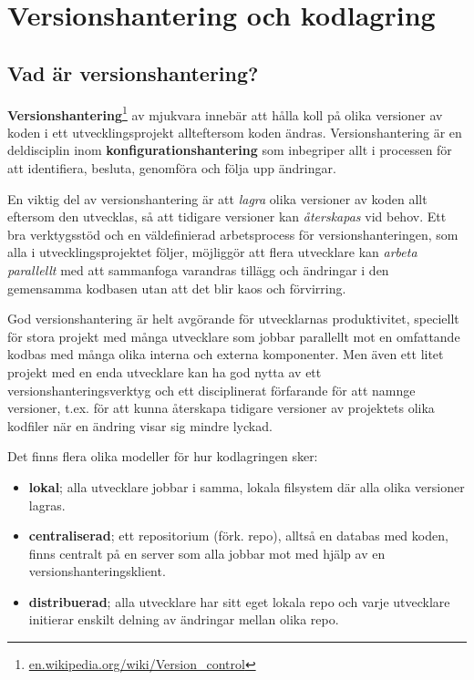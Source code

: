 

\chapter{Versionshantering och kodlagring}

\section{Vad är versionshantering?}

\textbf{Versionshantering}\footnote{\href{https://en.wikipedia.org/wiki/Version_control}{en.wikipedia.org/wiki/Version\_control}}  av mjukvara innebär att hålla koll på olika versioner av koden i ett utvecklingsprojekt allteftersom koden ändras. Versionshantering är en deldisciplin inom \textbf{konfigurationshantering}  som inbegriper allt i processen för att identifiera, besluta, genomföra och följa upp ändringar.

En viktig del av versionshantering är att \textit{lagra} olika versioner av koden allt eftersom den utvecklas, så att tidigare versioner kan \textit{återskapas} vid behov. Ett bra verktygsstöd och en väldefinierad arbetsprocess för versionshanteringen, som alla i utvecklingsprojektet följer, möjliggör att flera utvecklare kan \textit{arbeta parallellt} med att sammanfoga  varandras tillägg och ändringar i den gemensamma kodbasen utan att det blir kaos och förvirring.

God versionshantering är helt avgörande för utvecklarnas produktivitet, speciellt för stora projekt med många utvecklare som jobbar parallellt mot en omfattande kodbas med många olika interna och externa komponenter. 
Men även ett litet projekt med en enda utvecklare kan ha god nytta av ett versionshanteringsverktyg och ett disciplinerat förfarande för att namnge versioner, t.ex. för att kunna återskapa tidigare versioner av projektets olika kodfiler när en ändring visar sig mindre lyckad.   

Det finns flera olika modeller för hur kodlagringen sker:
\begin{itemize}
\item \textbf{lokal}; alla utvecklare jobbar i samma, lokala filsystem där alla olika versioner lagras.
\item \textbf{centraliserad}; ett repositorium (förk. repo), alltså en databas med koden, finns centralt på en server som alla jobbar mot med hjälp av en versionshanteringsklient.
\item \textbf{distribuerad}; alla utvecklare har sitt eget lokala repo och varje utvecklare initierar enskilt delning av ändringar mellan olika repo. 
\end{itemize}


